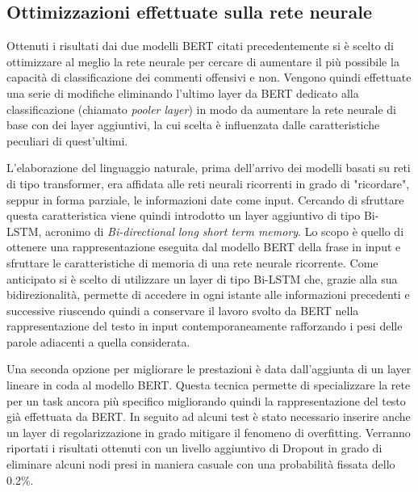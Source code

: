 \subsection{Ottimizzazioni effettuate sulla rete neurale}
    Ottenuti i risultati dai due modelli BERT citati precedentemente si è scelto di ottimizzare al meglio la rete neurale per cercare di aumentare il più possibile la capacità di classificazione dei commenti offensivi e non. Vengono quindi effettuate una serie di modifiche eliminando l'ultimo layer da BERT dedicato alla classificazione (chiamato \textit{pooler layer}) in modo da aumentare la rete neurale di base con dei layer aggiuntivi, la cui scelta è influenzata dalle caratteristiche peculiari di quest'ultimi.
    
    L'elaborazione del linguaggio naturale, prima dell'arrivo dei modelli basati su reti di tipo transformer, era affidata alle reti neurali ricorrenti in grado di "ricordare", seppur in forma parziale, le informazioni date come input. Cercando di sfruttare questa caratteristica viene quindi introdotto un layer aggiuntivo di tipo Bi-LSTM, acronimo di \textit{Bi-directional long short term memory}. Lo scopo è quello di ottenere una rappresentazione eseguita dal modello BERT della frase in input e sfruttare le caratteristiche di memoria di una rete neurale ricorrente. Come anticipato si è scelto di utilizzare un layer di tipo Bi-LSTM che, grazie alla sua bidirezionalità, permette di accedere in ogni istante alle informazioni precedenti e successive riuscendo quindi a conservare il lavoro svolto da BERT nella rappresentazione del testo in input contemporaneamente rafforzando i pesi delle parole adiacenti a quella considerata.
    
    Una seconda opzione per migliorare le prestazioni è data dall'aggiunta di un layer lineare in coda al modello BERT. Questa tecnica permette di specializzare la rete per un task ancora più specifico migliorando quindi la rappresentazione del testo già effettuata da BERT. In seguito ad alcuni test è stato necessario inserire anche un layer di regolarizzazione in grado mitigare il fenomeno di overfitting. Verranno riportati i risultati ottenuti con un livello aggiuntivo di Dropout in grado di eliminare alcuni nodi presi in maniera casuale con una probabilità fissata dello 0.2\%.


